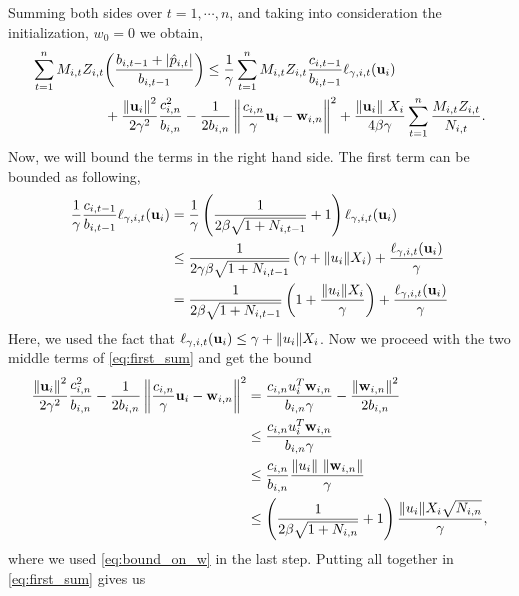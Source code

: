 Summing  both sides over $t=1,\cdots,n$, and taking into consideration the initialization,   $w_0=0$ we obtain,
\begin{equation}
\begin{split}
\sum_{t=1}^{n}M_{i,t}Z_{i,t}&{\left({\frac{b_{i,t-1} +\left\vert{\hat{p}_{i,t}}\right\vert}{b_{i,t-1}}}\right)} \le \frac{1}{\gamma}\sum_{t=1}^{n}{M_{i,t}Z_{i,t}\frac{c_{i,t-1}}{b_{i,t-1}}\ell_{\gamma,i,t}(\mathbf{u}_i)}\\
&+\frac{\left\Vert {\mathbf{u}_i} \right\Vert^2}{2\gamma^2}\frac{c_{i,n}^2}{b_{i,n}}-\frac{1}{2b_{i,n}}\left\Vert {\frac{c_{i,n}}{\gamma} \mathbf{u}_i-\mathbf{w}_{i,n}} \right\Vert^2
+\frac{\Vert\mathbf{u}_i\Vert~ X_i}{4\beta\gamma}\sum_{t=1}^{n}{\frac{M_{i,t}Z_{i,t}}{N_{i,t}}}.
\label{eq:first_sum}
\end{split}
\end{equation}
Now, we will bound the terms in the right hand side. The first term can be bounded as following,
\begin{equation*}
\begin{split}
\frac{1}{\gamma}\frac{c_{i,t-1}}{b_{i,t-1}}\ell_{\gamma,i,t}(\mathbf{u}_i)&=\frac{1}{\gamma}\left({\frac{1}{2\beta\sqrt{1+N_{i,t-1}}}+1}\right)\ell_{\gamma,i,t}(\mathbf{u}_i)\\
&\le \frac{1}{2\gamma\beta\sqrt{1+N_{i,t-1}}}\left({\gamma+\Vert u_i\Vert X_i}\right)+\frac{\ell_{\gamma,i,t}(\mathbf{u}_i)}{\gamma}\\
&=\frac{1}{2\beta\sqrt{1+N_{i,t-1}}}\left({1+\frac{\Vert u_i\Vert X_i}{\gamma}}\right)+\frac{\ell_{\gamma,i,t}(\mathbf{u}_i)}{\gamma}
\end{split}
\end{equation*}
Here, we used  the fact that $\ell_{\gamma,i,t}(\mathbf{u}_i)\le \gamma+\Vert u_i\Vert X_i$.
Now we proceed  with  the two middle terms of \eqref{eq:first_sum} and get the bound
\begin{equation*}
\begin{split}
\frac{\left\Vert {\mathbf{u}_i} \right\Vert^2}{2\gamma^2}\frac{c_{i,n}^2}{b_{i,n}}-\frac{1}{2b_{i,n}}\left\Vert {\frac{c_{i,n}}{\gamma} \mathbf{u}_i-\mathbf{w}_{i,n}} \right\Vert^2
&=\frac{c_{i,n}u_i^T\mathbf{w}_{i,n}}{b_{i,n}\gamma}-\frac{\left\Vert {\mathbf{w}_{i,n}} \right\Vert^2}{2b_{i,n}}\\
&\le \frac{c_{i,n}u_i^T\mathbf{w}_{i,n}}{b_{i,n}\gamma}\\
&\le\frac{c_{i,n}}{b_{i,n}}\frac{{\Vert u_i\Vert}~{\Vert\mathbf{w}_{i,n}\Vert}}{\gamma}\\
&\le\left({\frac{1}{2\beta\sqrt{1+N_{i,n}}}+1}\right)\frac{{\Vert u_i\Vert}X_i\sqrt{N_{i,n}}}{\gamma},
\end{split}
\end{equation*}
where we used \eqref{eq:bound_on_w} in the last step.
Putting all together in \eqref{eq:first_sum}  gives us
